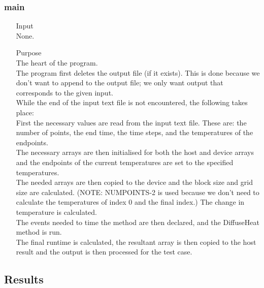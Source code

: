 \documentclass[11pt,a4paper]{article}
\begin{document}
\subsubsection{main}
\begin{itemize}
	\item[Input] \hfill\\
	None.
	\item[Purpose] \hfill\\
	The heart of the program.\\
	The program first deletes the output file (if it exists). This is done because we don't want to append to the output file; we only want output that corresponds to the given input.\\
	While the end of the input text file is not encountered, the following takes place:\\
	First the necessary values are read from the input text file. These are: the number of points, the end time, the time steps, and the temperatures of the endpoints.\\
	The necessary arrays are then initialised for both the host and device arrays and the endpoints of the current temperatures are set to the specified temperatures.\\
	The needed arrays are then copied to the device and the block size and grid size are calculated. (NOTE: NUMPOINTS-2 is used because we don't need to calculate the temperatures of index 0 and the final index.)
	The change in temperature is calculated.\\
	The events needed to time the method are then declared, and the DiffuseHeat method is run.\\
	The final runtime is calculated, the resultant array is then copied to the host result and the output is then processed for the test case.
\end{itemize}

\subsection{Results}

\newpage
{}
\end{document}
